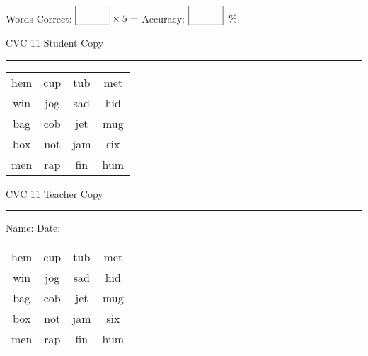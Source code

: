 \documentclass{memoir}
\begin{document}
\normalsize

Words Correct: $\fbox{\phantom{\huge 100}} \times 5 = $ Accuracy: $\fbox{\phantom{\huge 100}}\;\; \%$ 

\vfill

\newpage


\footnotesize \noindent
CVC 11 \hfill Student Copy
\smallskip
\hrule

\huge

\setlength{\tabcolsep}{14pt}
\def\arraystretch{2}

{\selectfont


\begin{vplace}[0.5]
\begin{center}
\begin{tabular}{cccc}
hem & cup & tub & met \\
win & jog & sad & hid \\
bag & cob & jet & mug \\
box & not & jam & six \\
men & rap & fin & hum \\
\end{tabular}
\end{center}
\end{vplace}

}

\newpage

\footnotesize \noindent
CVC 11 \hfill Teacher Copy
\smallskip
\hrule

\normalsize

\vfill

\noindent
Name: \underline{\hspace{1.75in}} \hfill Date: \underline{\hspace{1in}}

\huge

{\selectfont


\begin{vplace}[0.5]
\begin{center}
\begin{tabular}{cccc}
hem & cup & tub & met \\
win & jog & sad & hid \\
bag & cob & jet & mug \\
box & not & jam & six \\
men & rap & fin & hum \\
\end{tabular}
\end{center}
\end{vplace}



}
\end{document}
